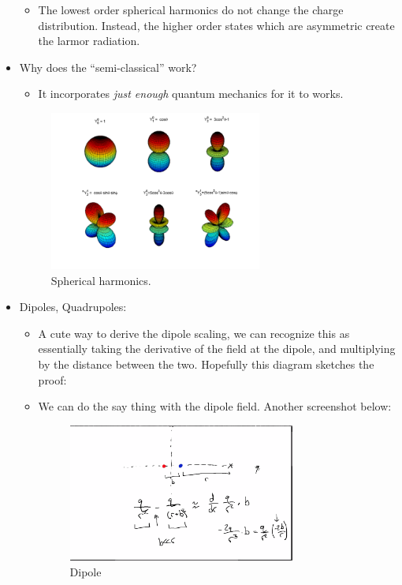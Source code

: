 \documentclass{article}
\begin{document}
\begin{itemize}
\begin{itemize}
        \item The lowest order spherical harmonics do not change the charge distribution. Instead, the higher order states which are asymmetric create the larmor radiation. 
    \end{itemize}
    
    \item Why does the ``semi-classical'' work?
    \begin{itemize}
        \item It incorporates \textit{just enough} quantum mechanics for it to works. 
    \end{itemize}
    
    \begin{figure}
        \centering
        \includegraphics[width = 0.66\textwidth]{sphericalharmonics.png}
        \caption{Spherical harmonics.}
        \label{fig:SH}
    \end{figure}
    
    \item Dipoles, Quadrupoles:
    \begin{itemize}
        \item A cute way to derive the dipole scaling, we can recognize this as essentially taking the derivative of the field at the dipole, and multiplying by the distance between the two. Hopefully this diagram sketches the proof:
        
        \item We can do the say thing with the dipole field. Another screenshot below: 
        
        \begin{figure}
            \centering
            \includegraphics[width=0.75\textwidth]{Screen Shot 2020-09-15 at 12.18.39 PM.png}
            \caption{Dipole}
            \label{fig:dip}
        \end{figure}
        

\end{itemize}
\end{itemize}
\end{document}
